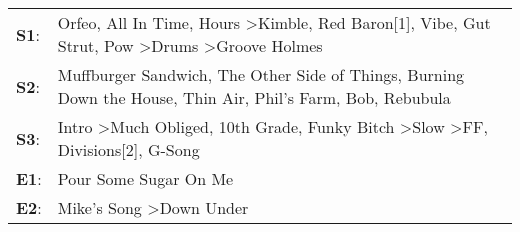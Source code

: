\begin{supertabular}{p{0.03\textwidth}p{0.92\textwidth}}
 \textbf{S1}:  &  Orfeo\textsuperscript{}, \enspace All In Time\textsuperscript{}, \enspace Hours\textsuperscript{} \textgreater \enspace Kimble\textsuperscript{}, \enspace Red Baron[1]\textsuperscript{}, \enspace Vibe\textsuperscript{}, \enspace Gut Strut\textsuperscript{}, \enspace Pow\textsuperscript{} \textgreater \enspace Drums\textsuperscript{} \textgreater \enspace Groove Holmes\textsuperscript{}  \enspace  \\
 \textbf{S2}:  &                                                                                                       Muffburger Sandwich\textsuperscript{}, \enspace The Other Side of Things\textsuperscript{}, \enspace Burning Down the House\textsuperscript{}, \enspace Thin Air\textsuperscript{}, \enspace Phil's Farm\textsuperscript{}, \enspace Bob\textsuperscript{}, \enspace Rebubula\textsuperscript{}  \enspace  \\
 \textbf{S3}:  &                                                                       Intro\textsuperscript{} \textgreater \enspace Much Obliged\textsuperscript{}, \enspace 10th Grade\textsuperscript{}, \enspace Funky Bitch\textsuperscript{} \textgreater \enspace Slow\textsuperscript{} \textgreater \enspace FF\textsuperscript{}, \enspace Divisions[2]\textsuperscript{}, \enspace G-Song\textsuperscript{}  \enspace  \\
 \textbf{E1}:  &                                                                                                                                                                                                                                                                                                                                                               Pour Some Sugar On Me\textsuperscript{}  \enspace  \\
 \textbf{E2}:  &                                                                                                                                                                                                                                                                                                                      Mike's Song\textsuperscript{} \textgreater \enspace Down Under\textsuperscript{}  \enspace  \\
\end{supertabular}

